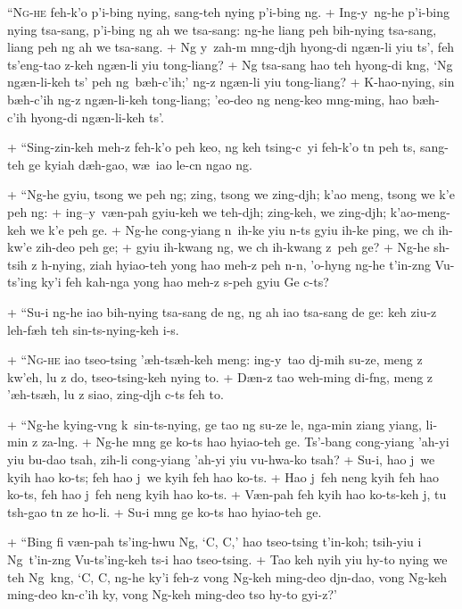 \header
\lettrine{``N}{g-he} feh-k'o p'i-bing nying, sang-teh nying p'i-bing ng.
+	Ing-y\y\ ng-he p'i-bing nying tsa-sang, p'i-bing ng ah we tsa-sang: ng-he liang peh bih-nying tsa-sang, liang peh ng ah we tsa-sang.
+	Ng y\y\ zah-m m\oo ng-dj\oo h hy\y ong-di ng\ae n-li yiu ts', feh ts'eng-tao z-keh ng\ae n-li yiu tong-liang?
+	Ng tsa-sang hao teh hy\y ong-di k\oo ng, `Ng ng\ae n-li-keh ts' peh ng\oo\ b\ae h-c'ih;' ng-z ng\ae n-li yiu tong-liang?
+	K\oo-hao-nying, sin b\ae h-c'ih ng-z ng\ae n-li-keh tong-liang; 'eo-deo ng neng-keo m\oo ng-ming, hao b\ae h-c'ih hy\y ong-di ng\ae n-li-keh ts'.
\par
+	``Sing-zin-keh meh-z feh-k'o peh keo, ng keh tsing-c\y{}i feh-k'o t\e n peh ts, sang-teh ge kyiah d\ae h-gao, w\ae\ iao le-c\y n ngao ng.
\par
+	``Ng-he gyiu, tsong we peh ng; zing, tsong we zing-dj\oo h; k'ao meng, tsong we k'e peh ng:
+	ing--y\y\ v\ae n-pah gyiu-keh we teh-dj\oo h; zing-keh, we zing-dj\oo h; k'ao-meng-keh we k'e peh ge.
+	Ng-he cong-yiang n\oo\ ih-ke yiu n-ts gyiu ih-ke ping, we c\oo h ih-kw'e zih-deo peh ge;
+	gyiu ih-kwang ng, we c\oo h ih-kwang z\oo\ peh ge?
+	Ng-he sh\y-tsih z \oo h-nying, ziah hyiao-teh y\y ong hao meh-z peh n-n\oo, 'o-hy\y \oo ng ng-he t'in-z\oo ng Vu-ts'ing ky'i feh kah-nga y\y ong hao meh-z s-peh gyiu Ge c\y-ts?
\par
+	``Su-i ng-he iao bih-nying tsa-sang de ng, ng ah iao tsa-sang de ge: keh ziu-z leh-f\ae h  teh sin-ts-nying-keh i-s.
\par
+	``\textsc{Ng-he} iao tseo-tsing '\ae h-ts\ae h-keh meng: ing-y\y\ tao dj\y-mih su-ze, meng z kw'eh, lu z do, tseo-tsing-keh nying to.
+	D\ae n-z tao weh-ming di-f\oo ng, meng z '\ae h-ts\ae h, lu z siao, zing-dj\oo h c\y-ts feh to.
\par
+	``Ng-he kying-v\oo ng k\oo\ sin-ts-nying, ge tao ng su-ze le, nga-min ziang yiang, li-min z za-l\oo ng.
+	Ng-he m\oo ng ge ko-ts hao hyiao-teh ge. Ts'-bang cong-yiang 'ah-yi yiu bu-dao tsah, zih-li cong-yiang 'ah-yi yiu vu-hwa-ko tsah?
+	Su-i, hao j\y\ we kyih hao ko-ts; feh hao j\y\ we kyih feh hao ko-ts.
+	Hao j\y\ feh neng kyih feh hao ko-ts, feh hao j\y\ feh neng kyih hao ko-ts.
+	V\ae n-pah feh kyih hao ko-ts-keh j\y, tu ts\oo h-gao t\e n ze ho-li.
+	Su-i m\oo ng ge ko-ts hao hyiao-teh ge.
\par
+	``Bing fi v\ae n-pah ts'ing-hwu Ng\oo, `C\y, C\y,' hao tseo-tsing t'in-koh; tsih-yiu i Ng\oo\ t'in-z\oo ng Vu-ts'ing-keh ts-i hao tseo-tsing.
+	Tao keh nyih yiu hy\y-to nying we teh Ng\oo\ k\oo ng, `C\y, C\y, ng\oo-he ky'i feh-z vong Ng-keh ming-deo dj\y n-dao, vong Ng-keh ming-deo k\e n-c'ih ky\y, vong Ng-keh ming-deo tso hy\y-to gyi-z?'
